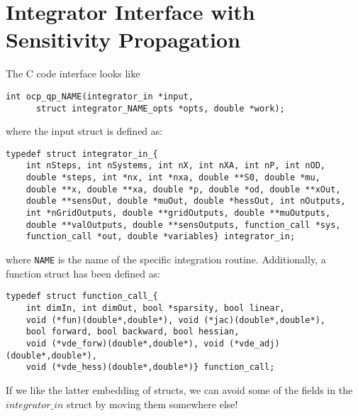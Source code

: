 \documentclass{report}
\begin{document}
\section{Integrator Interface with Sensitivity Propagation}

The C code interface looks like
\begin{verbatim}
int ocp_qp_NAME(integrator_in *input, 
      struct integrator_NAME_opts *opts, double *work);
\end{verbatim}
where the input struct is defined as:
\begin{verbatim}
typedef struct integrator_in_{
    int nSteps, int nSystems, int nX, int nXA, int nP, int nOD, 
    double *steps, int *nx, int *nxa, double **S0, double *mu,
    double **x, double **xa, double *p, double *od, double **xOut, 
    double **sensOut, double *muOut, double *hessOut, int nOutputs,
    int *nGridOutputs, double **gridOutputs, double **muOutputs, 
    double **valOutputs, double **sensOutputs, function_call *sys, 
    function_call *out, double *variables} integrator_in;
\end{verbatim}
where {\tt NAME} is the name of the specific integration routine. Additionally, a function struct has been defined as:
\begin{verbatim}
typedef struct function_call_{
    int dimIn, int dimOut, bool *sparsity, bool linear, 
    void (*fun)(double*,double*), void (*jac)(double*,double*), 
    bool forward, bool backward, bool hessian,
    void (*vde_forw)(double*,double*), void (*vde_adj)(double*,double*),
    void (*vde_hess)(double*,double*)} function_call;
\end{verbatim}
If we like the latter embedding of structs, we can avoid some of the fields in the $integrator\_in$ struct by moving them somewhere else!
\end{document}
